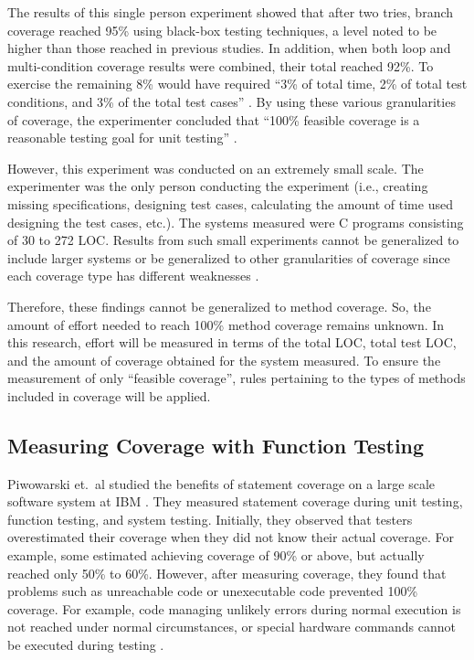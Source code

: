 The results of this single person experiment showed that after two tries,
branch coverage reached 95\% using black-box testing techniques, a level
noted to be higher than those reached in previous studies.  In addition,
when both loop and multi-condition coverage results were combined, their
total reached 92\%.  To exercise the remaining 8\% would have required
``3\% of total time, 2\% of total test conditions, and 3\% of the total
test cases'' \cite{Marick:1991}.  By using these various granularities of
coverage, the experimenter concluded that ``100\% feasible coverage is a
reasonable testing goal for unit testing'' \cite{Marick:1991}.

However, this experiment was conducted on an extremely small scale.  The
experimenter was the only person conducting the experiment (i.e., creating
missing specifications, designing test cases, calculating the amount of
time used designing the test cases, etc.).  The systems measured were C
programs consisting of 30 to 272 LOC.  Results from such small experiments
cannot be generalized to include larger systems \cite{Glass:1981} or be
generalized to other granularities of coverage since each coverage type has
different weaknesses \cite{Cornett}.

Therefore, these findings cannot be generalized to method coverage.  So,
the amount of effort needed to reach 100\% method coverage remains unknown.
In this research, effort will be measured in terms of the total LOC, total
test LOC, and the amount of coverage obtained for the system measured.  To
ensure the measurement of only ``feasible coverage'', rules pertaining to
the types of methods included in coverage will be applied.

\subsection{Measuring Coverage with Function Testing}
Piwowarski et.~al studied the benefits of statement coverage on a large
scale software system at IBM \cite{Piwowarski:1993}.  They measured
statement coverage during unit testing, function testing, and system
testing.  Initially, they observed that testers overestimated their
coverage when they did not know their actual coverage.  For example, some
estimated achieving coverage of 90\% or above, but actually reached only
50\% to 60\%.  However, after measuring coverage, they found that problems
such as unreachable code or unexecutable code prevented 100\% coverage.
For example, code managing unlikely errors during normal execution is not
reached under normal circumstances, or special hardware commands cannot be
executed during testing \cite{Piwowarski:1993}.

